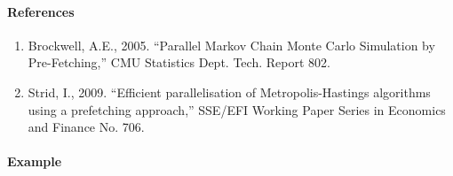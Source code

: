 \paragraph{References}

\begin{enumerate}
\def\labelenumi{\arabic{enumi}.}
\item
  Brockwell, A.E., 2005. ``Parallel Markov Chain Monte Carlo Simulation
  by Pre-Fetching,'' CMU Statistics Dept. Tech. Report 802.
\item
  Strid, I., 2009. ``Efficient parallelisation of Metropolis-Hastings
  algorithms using a prefetching approach,'' SSE/EFI Working Paper
  Series in Economics and Finance No. 706.
\end{enumerate}

\paragraph{Example}


